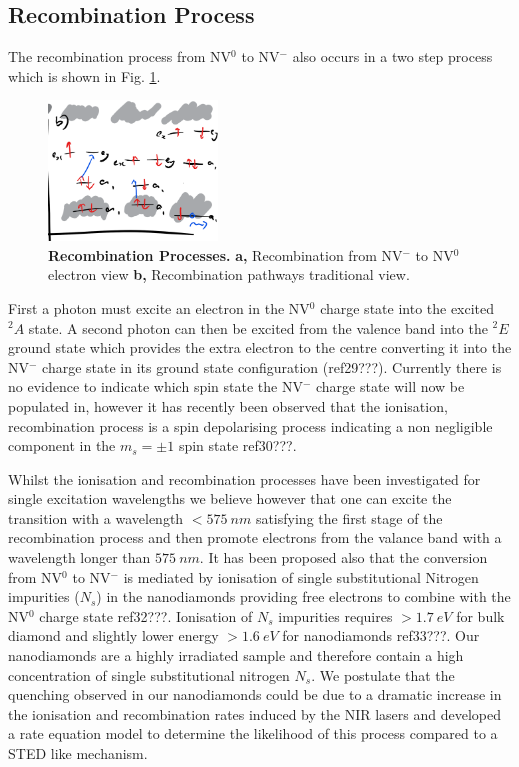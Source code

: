 \documentclass[preprint,prl,twocolumn]{revtex4}
\begin{document}
\subsection{Recombination Process}
The recombination process from NV$^0$ to NV$^-$ also occurs in a two step process which is shown in Fig. \ref{FigChargeConversionb}.

\begin{figure}[H]
  \centering
  \includegraphics[width=0.4\textwidth]{ChargeConversionb.png} 
 \caption{\textbf{Recombination Processes.} \textbf{a,} Recombination from NV$^-$ to NV$^0$ electron view \textbf{b,} Recombination pathways traditional view.} \label{FigChargeConversionb}
\end{figure}

First a photon must excite an electron in the NV$^0$ charge state into the excited $^2A$ state. A second photon can then be excited from the valence band into the $^2E$ ground state which provides the extra electron to the centre converting it into the NV$^-$ charge state in its ground state configuration (ref29???). Currently there is no evidence to indicate which spin state the NV$^-$ charge state will now be populated in, however it has recently been observed that the ionisation, recombination process is a spin depolarising process indicating a non negligible component in the $m_s=\pm1$ spin state ref30???.

Whilst the ionisation and recombination processes have been investigated for single excitation wavelengths we believe however that one can excite the transition with a wavelength $<\SI{575}{nm}$ satisfying the first stage of the recombination process and then promote electrons from the valance band with a wavelength longer than $\SI{575}{nm}$. It has been proposed also that the conversion from NV$^0$ to NV$^-$ is mediated by ionisation of single substitutional Nitrogen impurities ($N_s$) in the nanodiamonds providing free electrons to combine with the NV$^0$ charge state ref32???. Ionisation of $N_s$ impurities requires $>\SI{1.7}{eV}$ for bulk diamond and slightly lower energy $>\SI{1.6}{eV}$ for nanodiamonds ref33???. Our nanodiamonds are a highly irradiated sample and therefore contain a high concentration of single substitutional nitrogen $N_s$. We postulate that the quenching observed in our nanodiamonds could be due to a dramatic increase in the ionisation and recombination rates induced by the NIR lasers and developed a rate equation model to determine the likelihood of this process compared to a STED like mechanism.
\end{document}
